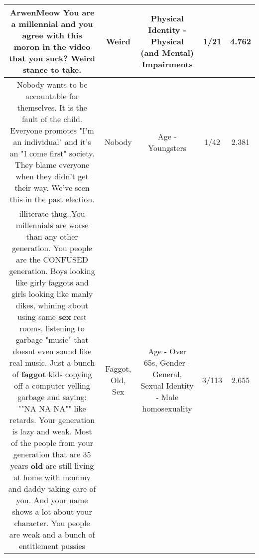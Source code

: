 \documentclass[11pt]{article}
\newlength\mylength
\begin{document}
\begin{center}
\begin{longtable}{|C{.65\mylength}|C{.30\mylength}|C{.12\mylength}|C{.12\mylength}|C{.12\mylength}|}
  \small ArwenMeow You are a millennial and you agree with this moron in the video that you suck? \textbf{Weird} stance to take.\normalsize   & Weird & Physical Identity - Physical (and Mental) Impairments & 1/21 & 4.762 \\  \hline
  \small Nobody wants to be accountable for themselves. It is the fault of the child. Everyone promotes "I'm an individual" and it's an "I come first" society. They blame everyone when they didn't get their way. We've seen this in the past election.\normalsize   & Nobody & Age - Youngsters & 1/42 & 2.381 \\  \hline
  \small illiterate thug..You millennials are worse than any other generation.  You people are the CONFUSED generation. Boys looking like girly faggots and girls looking like manly dikes, whining about using same \textbf{sex} rest rooms, listening to garbage "music" that doesnt even sound like real music. Just a bunch of \textbf{faggot} kids copying off a computer yelling garbage and saying:  ""NA NA NA"" like retards. Your generation is lazy and weak.  Most of the people from your generation that are 35 years \textbf{old} are still living at home with mommy and daddy taking care of you. And your name shows a lot about your character. You people are weak and a  bunch of entitlement pussies\normalsize   & Faggot, Old, Sex & Age - Over 65s, Gender - General, Sexual Identity - Male homosexuality & 3/113 & 2.655 \\  \hline

\end{longtable}
\end{center}
\end{document}
